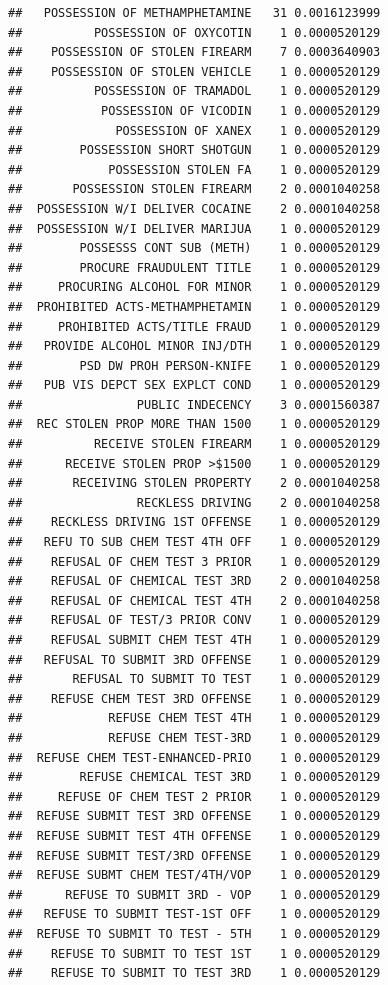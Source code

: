 \documentclass[]{book}
\begin{document}
\begin{verbatim}
##   POSSESSION OF METHAMPHETAMINE   31 0.0016123999
##          POSSESSION OF OXYCOTIN    1 0.0000520129
##    POSSESSION OF STOLEN FIREARM    7 0.0003640903
##    POSSESSION OF STOLEN VEHICLE    1 0.0000520129
##          POSSESSION OF TRAMADOL    1 0.0000520129
##           POSSESSION OF VICODIN    1 0.0000520129
##             POSSESSION OF XANEX    1 0.0000520129
##        POSSESSION SHORT SHOTGUN    1 0.0000520129
##            POSSESSION STOLEN FA    1 0.0000520129
##       POSSESSION STOLEN FIREARM    2 0.0001040258
##  POSSESSION W/I DELIVER COCAINE    2 0.0001040258
##  POSSESSION W/I DELIVER MARIJUA    1 0.0000520129
##        POSSESSS CONT SUB (METH)    1 0.0000520129
##        PROCURE FRAUDULENT TITLE    1 0.0000520129
##     PROCURING ALCOHOL FOR MINOR    1 0.0000520129
##  PROHIBITED ACTS-METHAMPHETAMIN    1 0.0000520129
##     PROHIBITED ACTS/TITLE FRAUD    1 0.0000520129
##   PROVIDE ALCOHOL MINOR INJ/DTH    1 0.0000520129
##        PSD DW PROH PERSON-KNIFE    1 0.0000520129
##   PUB VIS DEPCT SEX EXPLCT COND    1 0.0000520129
##                PUBLIC INDECENCY    3 0.0001560387
##  REC STOLEN PROP MORE THAN 1500    1 0.0000520129
##          RECEIVE STOLEN FIREARM    1 0.0000520129
##      RECEIVE STOLEN PROP >$1500    1 0.0000520129
##       RECEIVING STOLEN PROPERTY    2 0.0001040258
##                RECKLESS DRIVING    2 0.0001040258
##    RECKLESS DRIVING 1ST OFFENSE    1 0.0000520129
##   REFU TO SUB CHEM TEST 4TH OFF    1 0.0000520129
##    REFUSAL OF CHEM TEST 3 PRIOR    1 0.0000520129
##    REFUSAL OF CHEMICAL TEST 3RD    2 0.0001040258
##    REFUSAL OF CHEMICAL TEST 4TH    2 0.0001040258
##    REFUSAL OF TEST/3 PRIOR CONV    1 0.0000520129
##    REFUSAL SUBMIT CHEM TEST 4TH    1 0.0000520129
##   REFUSAL TO SUBMIT 3RD OFFENSE    1 0.0000520129
##       REFUSAL TO SUBMIT TO TEST    1 0.0000520129
##    REFUSE CHEM TEST 3RD OFFENSE    1 0.0000520129
##            REFUSE CHEM TEST 4TH    1 0.0000520129
##            REFUSE CHEM TEST-3RD    1 0.0000520129
##  REFUSE CHEM TEST-ENHANCED-PRIO    1 0.0000520129
##        REFUSE CHEMICAL TEST 3RD    1 0.0000520129
##     REFUSE OF CHEM TEST 2 PRIOR    1 0.0000520129
##  REFUSE SUBMIT TEST 3RD OFFENSE    1 0.0000520129
##  REFUSE SUBMIT TEST 4TH OFFENSE    1 0.0000520129
##  REFUSE SUBMIT TEST/3RD OFFENSE    1 0.0000520129
##  REFUSE SUBMT CHEM TEST/4TH/VOP    1 0.0000520129
##      REFUSE TO SUBMIT 3RD - VOP    1 0.0000520129
##   REFUSE TO SUBMIT TEST-1ST OFF    1 0.0000520129
##  REFUSE TO SUBMIT TO TEST - 5TH    1 0.0000520129
##    REFUSE TO SUBMIT TO TEST 1ST    1 0.0000520129
##    REFUSE TO SUBMIT TO TEST 3RD    1 0.0000520129

\end{verbatim}
\end{document}
